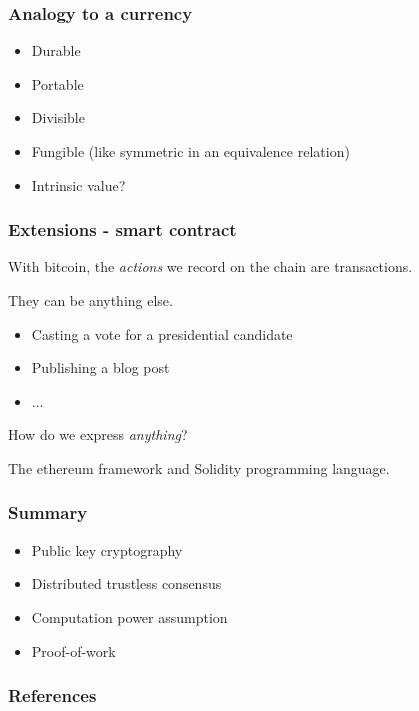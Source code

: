 \documentclass{beamer}
\begin{document}
\begin{frame}
\frametitle{Analogy to a currency}

\begin{itemize}
  \item Durable
  \item Portable
  \item Divisible
  \item Fungible (like symmetric in an equivalence relation)
  \item Intrinsic value?
\end{itemize}

\end{frame}

\begin{frame}
\frametitle{Extensions - smart contract}

With bitcoin, the \textit{actions} we record on the chain are transactions.

They can be anything else.

\vspace{0.2in}

\begin{itemize}
  \item Casting a vote for a presidential candidate
  \item Publishing a blog post
  \item ...
\end{itemize}

\vspace{0.2in}
How do we express \textit{anything}?

The ethereum framework and Solidity programming language.

\end{frame}

\begin{frame}
\frametitle{Summary}

\begin{itemize}
  \item Public key cryptography
  \item Distributed trustless consensus
  \item Computation power assumption
  \item Proof-of-work
\end{itemize}

\end{frame}

\begin{frame}
\frametitle{References}

\end{frame}
\end{document}
